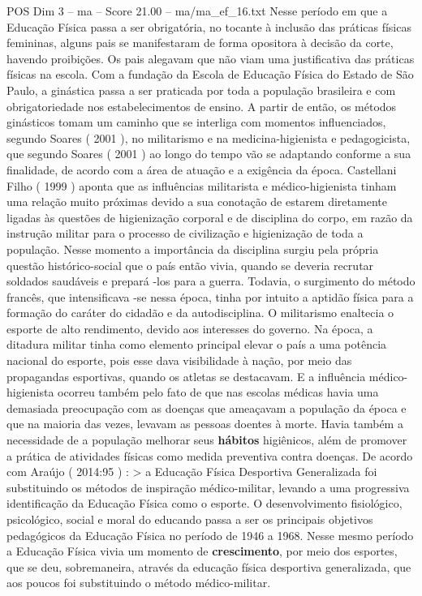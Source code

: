 \begin{textsample}{POS Dim 3 – ma – Score 21.00 – ma/ma\_ef\_16.txt}
Nesse período em que a Educação Física passa a ser obrigatória, no tocante à inclusão das práticas físicas femininas, alguns pais se manifestaram de forma opositora à decisão da corte, havendo proibições.
Os pais alegavam que não viam uma justificativa das práticas físicas na escola.
Com a fundação da Escola de Educação Física do Estado de São Paulo, a ginástica passa a ser praticada por toda a população brasileira e com obrigatoriedade nos estabelecimentos de ensino.
A partir de então, os métodos ginásticos tomam um caminho que se interliga com momentos influenciados, segundo Soares ( 2001 ), no militarismo e na medicina-higienista e pedagogicista, que segundo Soares ( 2001 ) ao longo do tempo vão se adaptando conforme a sua finalidade, de acordo com a área de atuação e a exigência da época.
Castellani Filho ( 1999 ) aponta que as influências militarista e médico-higienista tinham uma relação muito próximas devido a sua conotação de estarem diretamente ligadas às questões de higienização corporal e de disciplina do corpo, em razão da instrução militar para o processo de civilização e higienização de toda a população.
Nesse momento a importância da disciplina surgiu pela própria questão histórico-social que o país então vivia, quando se deveria recrutar soldados saudáveis e prepará -los para a guerra.
Todavia, o surgimento do método francês, que intensificava -se nessa época, tinha por intuito a aptidão física para a formação do caráter do cidadão e da autodisciplina.
O militarismo enaltecia o esporte de alto rendimento, devido aos interesses do governo.
Na época, a ditadura militar tinha como elemento principal elevar o país a uma potência nacional do esporte, pois esse dava visibilidade à nação, por meio das propagandas esportivas, quando os atletas se destacavam.
E a influência médico-higienista ocorreu também pelo fato de que nas escolas médicas havia uma demasiada preocupação com as doenças que ameaçavam a população da época e que na maioria das vezes, levavam as pessoas doentes à morte.
Havia também a necessidade de a população melhorar seus \textbf{hábitos} higiênicos, além de promover a prática de atividades físicas como medida preventiva contra doenças.
De acordo com Araújo ( 2014:95 ) : > a Educação Física Desportiva Generalizada foi substituindo os métodos de inspiração médico-militar, levando a uma progressiva identificação da Educação Física como o esporte.
O desenvolvimento fisiológico, psicológico, social e moral do educando passa a ser os principais objetivos pedagógicos da Educação Física no período de 1946 a 1968.
Nesse mesmo período a Educação Física vivia um momento de \textbf{crescimento}, por meio dos esportes, que se deu, sobremaneira, através da educação física desportiva generalizada, que aos poucos foi substituindo o método médico-militar.

\end{textsample}
